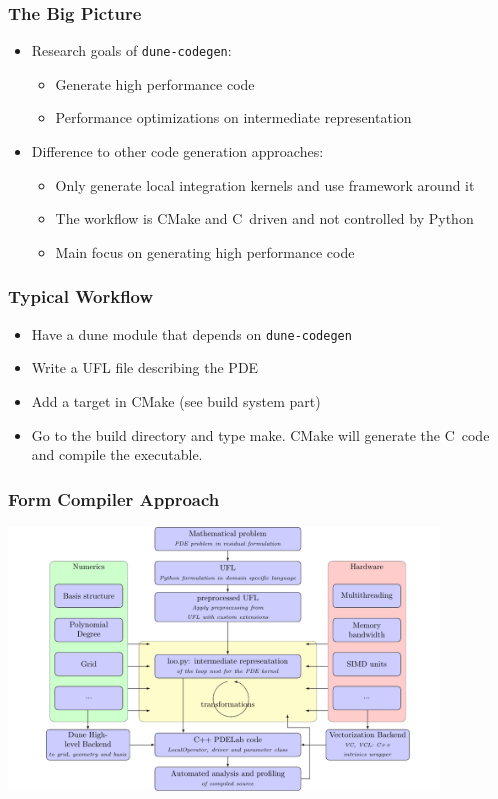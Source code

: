 \documentclass[aspectratio=169,11pt]{beamer}
\theoremstyle{definition}
\def\CC{{C\nolinebreak[4]\hspace{-.05em}\raisebox{.4ex}{\tiny\bf ++}}}
\begin{document}
\begin{frame}[fragile]
  \frametitle{The Big Picture}
  \begin{itemize}
  \item Research goals of \lstinline{dune-codegen}:
    \begin{itemize}
    \item Generate high performance code
    \item Performance optimizations on intermediate representation
    \end{itemize}
  \item Difference to other code generation approaches:
    \begin{itemize}
    \item Only generate local integration kernels and use framework around it
    \item The workflow is CMake and \CC\ driven and not controlled by Python
    \item Main focus on generating high performance code
    \end{itemize}
  \end{itemize}
\end{frame}

\begin{frame}
  \frametitle{Typical Workflow}
  \begin{itemize}
  \item Have a dune module that depends on \lstinline{dune-codegen}
  \item Write a UFL file describing the PDE
  \item Add a target in CMake (see build system part)
  \item Go to the build directory and type make. CMake will generate the \CC\
    code and compile the executable.
  \end{itemize}
\end{frame}

\begin{frame}
 \frametitle{Form Compiler Approach}
 \centering
 \includegraphics[width=4.5in]{./figures/approach.pdf}
\end{frame}
\end{document}

